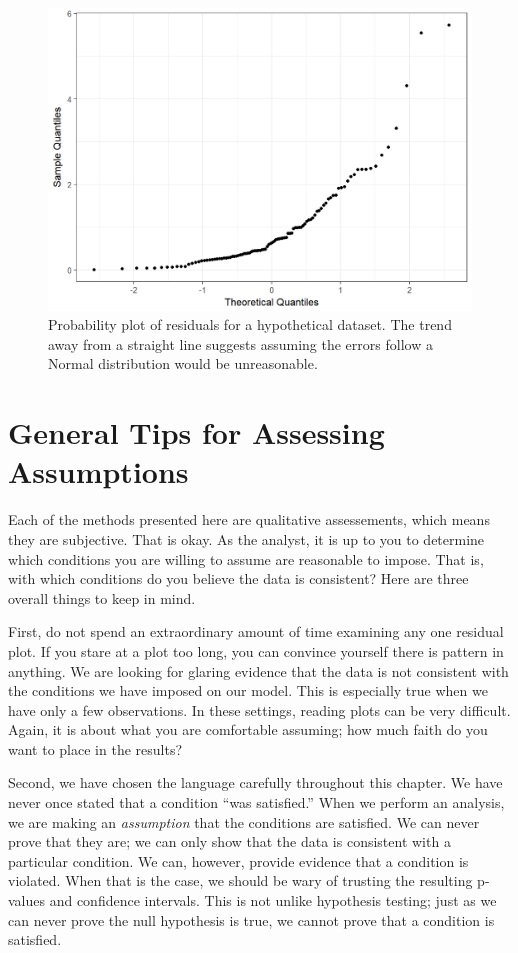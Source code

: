 \documentclass[]{book}
\theoremstyle{plain}
\theoremstyle{mydefn}
\theoremstyle{myexmpl}
\theoremstyle{remark}
\begin{document}
\begin{figure}

{\centering \includegraphics[width=0.8\linewidth]{./Images/regassessment-normal-bad-1} 

}

\caption{Probability plot of residuals for a hypothetical dataset.  The trend away from a straight line suggests assuming the errors follow a Normal distribution would be unreasonable.}\label{fig:regassessment-normal-bad}
\end{figure}

\section{General Tips for Assessing
Assumptions}\label{general-tips-for-assessing-assumptions}

Each of the methods presented here are qualitative assessements, which
means they are subjective. That is okay. As the analyst, it is up to you
to determine which conditions you are willing to assume are reasonable
to impose. That is, with which conditions do you believe the data is
consistent? Here are three overall things to keep in mind.

First, do not spend an extraordinary amount of time examining any one
residual plot. If you stare at a plot too long, you can convince
yourself there is pattern in anything. We are looking for glaring
evidence that the data is not consistent with the conditions we have
imposed on our model. This is especially true when we have only a few
observations. In these settings, reading plots can be very difficult.
Again, it is about what you are comfortable assuming; how much faith do
you want to place in the results?

Second, we have chosen the language carefully throughout this chapter.
We have never once stated that a condition ``was satisfied.'' When we
perform an analysis, we are making an \emph{assumption} that the
conditions are satisfied. We can never prove that they are; we can only
show that the data is consistent with a particular condition. We can,
however, provide evidence that a condition is violated. When that is the
case, we should be wary of trusting the resulting p-values and
confidence intervals. This is not unlike hypothesis testing; just as we
can never prove the null hypothesis is true, we cannot prove that a
condition is satisfied.
\end{document}
